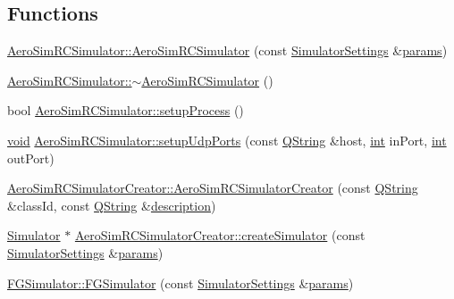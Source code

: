 \subsection*{Functions}
\begin{DoxyCompactItemize}
\item 
\hyperlink{group___h_i_t_l_plugin_ga0f5306deb22a08981f652dbb154f3e55}{Aero\-Sim\-R\-C\-Simulator\-::\-Aero\-Sim\-R\-C\-Simulator} (const \hyperlink{group___h_i_t_l_plugin_ga052199f1328d3002bce3e45345aa7f4e}{Simulator\-Settings} \&\hyperlink{glext_8h_afeb6390ab3bc8a0e96a88aff34d52288}{params})
\item 
\hyperlink{group___h_i_t_l_plugin_ga8627049b9a905adb162384c682255bd3}{Aero\-Sim\-R\-C\-Simulator\-::$\sim$\-Aero\-Sim\-R\-C\-Simulator} ()
\item 
bool \hyperlink{group___h_i_t_l_plugin_gae47d5533f13e5ad9a6095ba2bc61bade}{Aero\-Sim\-R\-C\-Simulator\-::setup\-Process} ()
\item 
\hyperlink{group___u_a_v_objects_plugin_ga444cf2ff3f0ecbe028adce838d373f5c}{void} \hyperlink{group___h_i_t_l_plugin_ga593e2c3f1a4b5e541f32668be73ece6d}{Aero\-Sim\-R\-C\-Simulator\-::setup\-Udp\-Ports} (const \hyperlink{group___u_a_v_objects_plugin_gab9d252f49c333c94a72f97ce3105a32d}{Q\-String} \&host, \hyperlink{ioapi_8h_a787fa3cf048117ba7123753c1e74fcd6}{int} in\-Port, \hyperlink{ioapi_8h_a787fa3cf048117ba7123753c1e74fcd6}{int} out\-Port)
\item 
\hyperlink{group___h_i_t_l_plugin_ga7e85a0e376c9dcd7dae84a4f2cf14d10}{Aero\-Sim\-R\-C\-Simulator\-Creator\-::\-Aero\-Sim\-R\-C\-Simulator\-Creator} (const \hyperlink{group___u_a_v_objects_plugin_gab9d252f49c333c94a72f97ce3105a32d}{Q\-String} \&class\-Id, const \hyperlink{group___u_a_v_objects_plugin_gab9d252f49c333c94a72f97ce3105a32d}{Q\-String} \&\hyperlink{sdlgamepad_8dox_ae82208d022e4246ddf1e4f481a3f81b0}{description})
\item 
\hyperlink{class_simulator}{Simulator} $\ast$ \hyperlink{group___h_i_t_l_plugin_ga25c808a48fec179504d84ef28fe8e762}{Aero\-Sim\-R\-C\-Simulator\-Creator\-::create\-Simulator} (const \hyperlink{group___h_i_t_l_plugin_ga052199f1328d3002bce3e45345aa7f4e}{Simulator\-Settings} \&\hyperlink{glext_8h_afeb6390ab3bc8a0e96a88aff34d52288}{params})
\item 
\hyperlink{group___h_i_t_l_plugin_gac56390412d899fc09748d050d06a7fab}{F\-G\-Simulator\-::\-F\-G\-Simulator} (const \hyperlink{group___h_i_t_l_plugin_ga052199f1328d3002bce3e45345aa7f4e}{Simulator\-Settings} \&\hyperlink{glext_8h_afeb6390ab3bc8a0e96a88aff34d52288}{params})

\end{DoxyCompactItemize}
